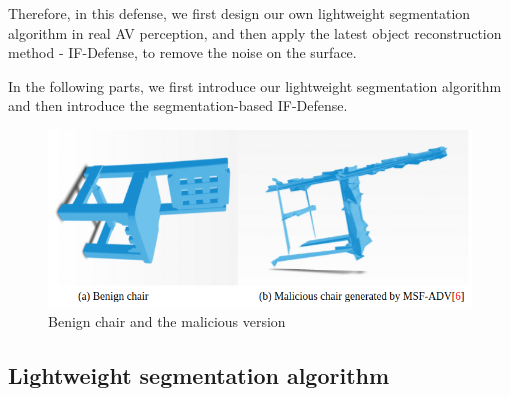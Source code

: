 Therefore, in this defense, we first design our own lightweight segmentation algorithm in real AV perception, 
and then apply the latest object reconstruction method - IF-Defense\cite{if-defense}, to remove the noise on the surface.

In the following parts, we first introduce our lightweight segmentation algorithm and then introduce the segmentation-based IF-Defense\cite{if-defense}.



\begin{figure}
	\centering
	\includegraphics[width=1\linewidth]{figure/benign&ma.png}
	\caption{Benign chair and the malicious version}
	\label{fig:noisy}
\end{figure}


\subsection{Lightweight segmentation algorithm}

